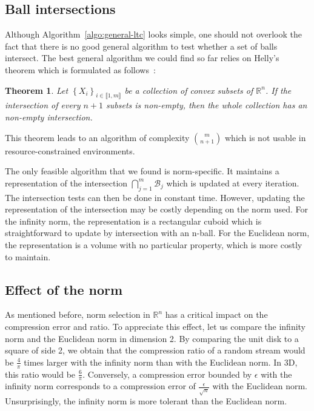\documentclass[10pt, conference, compsocconf]{IEEEtran}
\newtheorem*{theorem}{Theorem}
\begin{document}
\subsection{Ball intersections}

Although Algorithm~\ref{algo:general-ltc} looks simple, one should not
overlook the fact that there is no good general algorithm to test
whether a set of balls intersect. The best general algorithm we could find
so far relies on Helly's theorem which is formulated as follows~\cite{helly1923mengen}:
\begin{theorem}
Let $\left\{ X_i \right\}_{i \in \llbracket 1, m \rrbracket}$ be a collection of convex subsets of $\mathbb{R}^n$. If the intersection of every $n+1$
subsets is non-empty, then the whole collection has an non-empty intersection.
\end{theorem}
\noindent This theorem leads to an algorithm of complexity ${m \choose n+1}$ which is
not usable in resource-constrained environments.

The only feasible algorithm that we found is norm-specific. It
maintains a representation of the intersection
$\bigcap_{j=1}^{m}{\mathcal{B}_j}$ which is updated at every iteration.
The intersection tests can then be done in constant time. However,
updating the representation of the intersection may be costly
depending on the norm used. For the infinity norm, the representation
is a rectangular cuboid which is straightforward to update by
intersection with an n-ball.
For the Euclidean norm, the representation is a volume with no particular property,
which is more costly to maintain.

\subsection{Effect of the norm}

As mentioned before, norm selection in $\mathbb{R}^n$ has a critical
impact on the compression error and ratio. To appreciate this effect,
let us compare the infinity norm and the
Euclidean norm in dimension 2. By comparing the unit disk to a
square of side 2, we obtain that the compression ratio of a random stream would
be $\frac{4}{\pi}$ times larger with the infinity norm than with the 
Euclidean norm. In 3D, this ratio would be $\frac{6}{\pi}$. Conversely, 
a compression error bounded by $\epsilon$ with the infinity norm 
corresponds to a compression error of $\frac{\epsilon}{\sqrt{n}}$ with 
the Euclidean norm. Unsurprisingly, the
infinity norm is more tolerant than the Euclidean norm.
\end{document}
